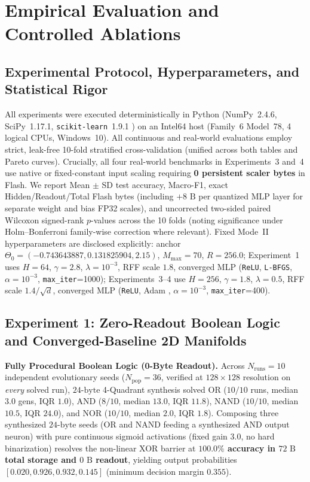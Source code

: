 \section{Empirical Evaluation and Controlled Ablations}
\label{sec:experiments}

\subsection{Experimental Protocol, Hyperparameters, and Statistical Rigor}
\label{sec:protocol}

All experiments were executed deterministically in Python (NumPy~2.4.6, SciPy~1.17.1, \texttt{scikit-learn}~1.9.1 \cite{pedregosa2011scikit}) on an Intel64 host (Family~6 Model~78, 4 logical CPUs, Windows~10). All continuous and real-world evaluations employ strict, leak-free 10-fold stratified cross-validation (unified across both tables and Pareto curves). Crucially, all four real-world benchmarks in Experiments~3 and~4 use native or fixed-constant input scaling requiring \textbf{0 persistent scaler bytes} in Flash. We report Mean $\pm$ SD test accuracy, Macro-F1, exact Hidden/Readout/Total Flash bytes (including $+8\text{ B}$ per quantized MLP layer for separate weight and bias FP32 scales), and uncorrected two-sided paired Wilcoxon signed-rank $p$-values \cite{demsar2006statistical} across the 10 folds (noting significance under Holm--Bonferroni family-wise correction where relevant). Fixed Mode~II hyperparameters are disclosed explicitly: anchor $\Theta_0 = (-0.743643887, 0.131825904, 2.15)$, $M_{\max}=70$, $R=256.0$; Experiment~1 uses $H=64$, $\gamma=2.8$, $\lambda=10^{-3}$, RFF scale $1.8$, converged MLP (\texttt{ReLU}, \texttt{L-BFGS}, $\alpha=10^{-3}$, \texttt{max\_iter}=1000); Experiments~3--4 use $H=256$, $\gamma=1.8$, $\lambda=0.5$, RFF scale $1.4/\sqrt{d}$, converged MLP (\texttt{ReLU}, Adam \cite{kingma2015adam}, $\alpha=10^{-3}$, \texttt{max\_iter}=400).

\subsection{Experiment 1: Zero-Readout Boolean Logic and Converged-Baseline 2D Manifolds}
\label{sec:exp_1}

\textbf{Fully Procedural Boolean Logic (0-Byte Readout).} Across $N_{\mathrm{runs}}=10$ independent evolutionary seeds ($N_{\mathrm{pop}}=36$, verified at $128\times 128$ resolution on \textit{every} solved run), $24\text{-byte}$ 4-Quadrant synthesis solved OR ($10/10$ runs, median $3.0$ gens, IQR $1.0$), AND ($8/10$, median $13.0$, IQR $11.8$), NAND ($10/10$, median $10.5$, IQR $24.0$), and NOR ($10/10$, median $2.0$, IQR $1.8$). Composing three synthesized $24\text{-byte}$ seeds (OR and NAND feeding a synthesized AND output neuron) with pure continuous sigmoid activations (fixed gain $3.0$, no hard binarization) resolves the non-linear XOR barrier \cite{minsky1969perceptrons} at \textbf{$100.0\%$ accuracy in $72\text{ B}$ total storage and $0\text{ B}$ readout}, yielding output probabilities $[0.020, 0.926, 0.932, 0.145]$ (minimum decision margin $0.355$).

